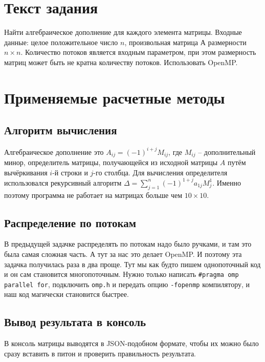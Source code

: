 \documentclass[a4paper]{article}
\begin{document}
  \newpage
  \tableofcontents
  \newpage

  \section{Текст задания}
  Найти алгебраическое дополнение для каждого элемента матрицы.
  Входные данные: целое положительное число $n$, произвольная матрица А размерности $n \times n$.
  Количество потоков является входным параметром, при этом размерность
  матриц может быть не кратна количеству потоков. Использовать OpenMP. \cite{task}

  \newpage
  \section{Применяемые расчетные методы}
  \subsection{Алгоритм вычисления}
  Алгебраическое дополнение это $A_{ij} = (-1)^{i+j}M_{ij}$, где $M_{ij}$ -- дополнительный минор, определитель матрицы,
  получающейся из исходной матрицы $A$ путём вычёркивания $i$-й строки и $j$-го столбца. \cite{math}
  Для вычисления определителя использовался рекурсивный алгоритм $\Delta=\sum_{j=1}^n (-1)^{1+j} a_{1j} M_j^1$. \cite{det}
  Именно поэтому программа не работает на матрицах больше чем $10 \times 10$.

  \subsection{Распределение по потокам}
  В предыдущей задачке распределять по потокам надо было ручками, и там это была самая сложная часть.
  А тут за нас это делает OpenMP.
  И поэтому эта задачка получилась раза в два проще.
  Тут мы как будто пишем однопоточный код и он сам становится многопоточным.
  Нужно только написать \texttt{\#pragma omp parallel for}, подключить \texttt{omp.h}
  и передать опцию \texttt{-fopenmp} компилятору, и наш код магически становится быстрее.

  \subsection{Вывод результата в консоль}
  В консоль матрицы выводятся в JSON-подобном формате, чтобы их можно было сразу вставить в питон и проверить правильность результата.
\end{document}
